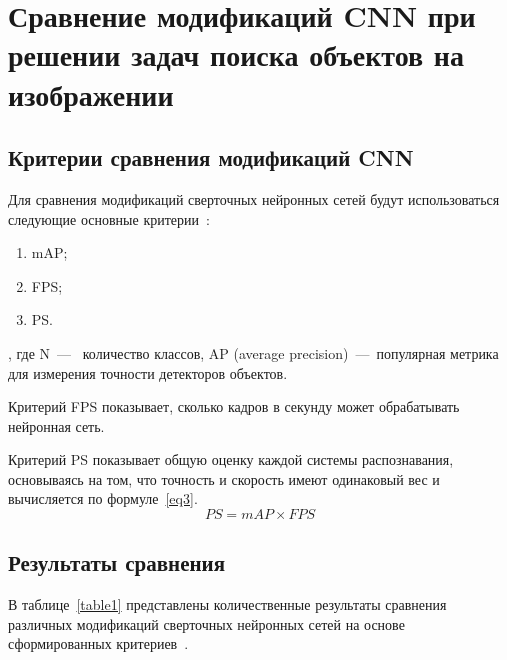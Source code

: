 \chapter{Сравнение модификаций CNN при решении задач поиска объектов на изображении}

\section{Критерии сравнения модификаций CNN}

Для сравнения модификаций сверточных нейронных сетей будут использоваться следующие основные критерии~\cite{base, all, yolobase, cmp}:
\begin{enumerate}
	\item mAP;
	\item FPS;
	\item PS.
\end{enumerate}

, где N~---~ количество классов,
AP (average precision)~---~популярная метрика для измерения точности детекторов объектов.

Критерий FPS показывает, сколько кадров в секунду может обрабатывать нейронная сеть.

Критерий PS показывает общую оценку каждой системы распознавания, основываясь на том, что точность и скорость имеют одинаковый вес и вычисляется по формуле~\ref{eq3}.
\begin{equation}
	\label{eq3}
	PS = mAP \times FPS
\end{equation}

\section{Результаты сравнения}

В таблице~\ref{table1} представлены количественные результаты сравнения различных модификаций сверточных нейронных сетей на основе сформированных критериев~\cite{all, yolobase}.


